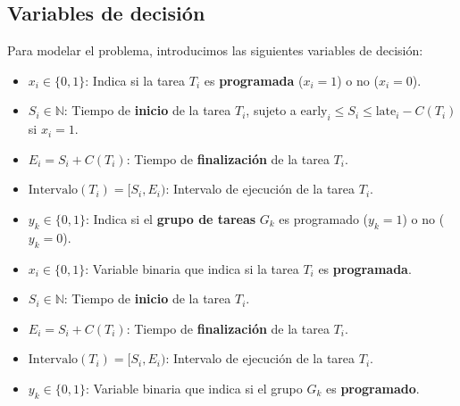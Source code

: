 \documentclass{article}
\begin{document}
\vspace{0.5cm}

\subsection*{Variables de decisión}

Para modelar el problema, introducimos las siguientes variables de decisión:

\begin{itemize}
    \item \( x_i \in \{0, 1\} \): Indica si la tarea \( T_i \) es \textbf{programada} (\( x_i = 1 \)) o no (\( x_i = 0 \)).
    \item \( S_i \in \mathbb{N} \): Tiempo de \textbf{inicio} de la tarea \( T_i \), sujeto a \( \text{early}_i \leq S_i \leq \text{late}_i - C(T_i) \) si \( x_i = 1 \).
    \item \( E_i = S_i + C(T_i) \): Tiempo de \textbf{finalización} de la tarea \( T_i \).
    \item \( \text{Intervalo}(T_i) = [S_i, E_i) \): Intervalo de ejecución de la tarea \( T_i \).
    \item \( y_k \in \{0, 1\} \): Indica si el \textbf{grupo de tareas} \( G_k \) es programado (\( y_k = 1 \)) o no (\( y_k = 0 \)).
\end{itemize}

\vspace{0.5cm}

\begin{tcolorbox}[colback=gray!5!white, colframe=gray!75!black, title={Variables de decisión}]
    \begin{itemize}
        \item \( x_i \in \{0, 1\} \): Variable binaria que indica si la tarea \( T_i \) es \textbf{programada}.
        \item \( S_i \in \mathbb{N} \): Tiempo de \textbf{inicio} de la tarea \( T_i \).
        \item \( E_i = S_i + C(T_i) \): Tiempo de \textbf{finalización} de la tarea \( T_i \).
        \item \( \text{Intervalo}(T_i) = [S_i, E_i) \): Intervalo de ejecución de la tarea \( T_i \).
        \item \( y_k \in \{0, 1\} \): Variable binaria que indica si el grupo \( G_k \) es \textbf{programado}.
    \end{itemize}
\end{tcolorbox}

\vspace{0.5cm}
\end{document}
